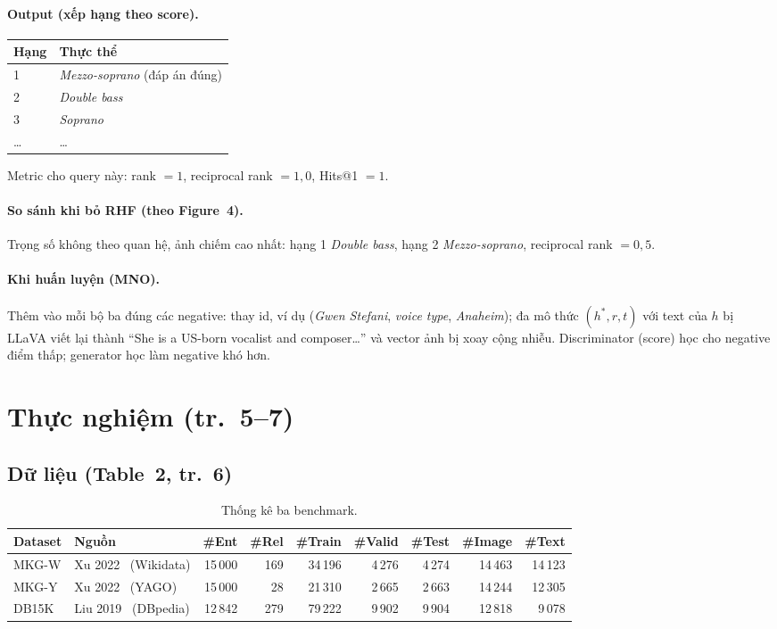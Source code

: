 \documentclass[11pt,a4paper]{article}
\newcommand{\Ent}[1]{\textit{#1}}
\begin{document}
\paragraph{Output (xếp hạng theo score).}
\begin{center}\small
\begin{tabular}{@{}ll@{}}
\toprule
Hạng & Thực thể\\
\midrule
1 & \Ent{Mezzo-soprano} (đáp án đúng)\\
2 & \Ent{Double bass}\\
3 & \Ent{Soprano}\\
\ldots & \ldots\\
\bottomrule
\end{tabular}
\end{center}
Metric cho query này: rank $= 1$, reciprocal rank $= 1{,}0$, Hits@1 $= 1$.

\paragraph{So sánh khi bỏ RHF (theo Figure~4).}
Trọng số không theo quan hệ, ảnh chiếm cao nhất: hạng 1 \Ent{Double bass}, hạng 2 \Ent{Mezzo-soprano}, reciprocal rank $= 0{,}5$.

\paragraph{Khi huấn luyện (MNO).}
Thêm vào mỗi bộ ba đúng các negative: thay id, ví dụ (\Ent{Gwen Stefani}, \Ent{voice type}, \Ent{Anaheim}); đa mô thức $(h^*, r, t)$ với text của $h$ bị LLaVA viết lại thành ``She is a US-born vocalist and composer\ldots'' và vector ảnh bị xoay cộng nhiễu. Discriminator (score) học cho negative điểm thấp; generator học làm negative khó hơn.

\section{Thực nghiệm (tr.~5--7)}

\subsection{Dữ liệu (Table~2, tr.~6)}

\begin{table}[H]
\centering\small
\caption{Thống kê ba benchmark.}
\label{tab:data}
\begin{tabular}{@{}llrrrrrrr@{}}
\toprule
Dataset & Nguồn & \#Ent & \#Rel & \#Train & \#Valid & \#Test & \#Image & \#Text\\
\midrule
MKG-W & Xu 2022~\cite{mkg} (Wikidata) & 15\,000 & 169 & 34\,196 & 4\,276 & 4\,274 & 14\,463 & 14\,123\\
MKG-Y & Xu 2022~\cite{mkg} (YAGO) & 15\,000 & 28 & 21\,310 & 2\,665 & 2\,663 & 14\,244 & 12\,305\\
DB15K & Liu 2019~\cite{mmkg} (DBpedia) & 12\,842 & 279 & 79\,222 & 9\,902 & 9\,904 & 12\,818 & 9\,078\\
\bottomrule
\end{tabular}
\end{table}
\end{document}
